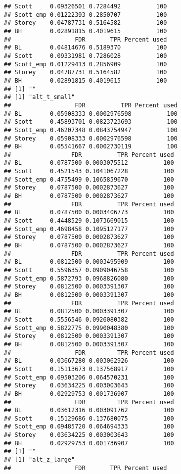 \documentclass{article}\usepackage[]{graphicx}\usepackage[]{color}
\makeatletter
\newenvironment{kframe}{%
 \def\at@end@of@kframe{}%
 \ifinner\ifhmode%
  \def\at@end@of@kframe{\end{minipage}}%
  \begin{minipage}{\columnwidth}%
 \fi\fi%
 \def\FrameCommand##1{\hskip\@totalleftmargin \hskip-\fboxsep
 \colorbox{shadecolor}{##1}\hskip-\fboxsep
     \hskip-\linewidth \hskip-\@totalleftmargin \hskip\columnwidth}%
 \MakeFramed {\advance\hsize-\width
   \@totalleftmargin\z@ \linewidth\hsize
   \@setminipage}}%
 {\par\unskip\endMakeFramed%
 \at@end@of@kframe}
\newenvironment{knitrout}{}{} %
\makeatother
\begin{document}
\begin{knitrout}
\begin{kframe}
\begin{verbatim}
## Scott     0.09326501 0.7284492          100
## Scott_emp 0.01222393 0.2850707          100
## Storey    0.04787731 0.5164582          100
## BH        0.02891815 0.4019615          100
##                  FDR       TPR Percent used
## BL        0.04814676 0.5189370          100
## Scott     0.09331981 0.7286028          100
## Scott_emp 0.01229413 0.2856909          100
## Storey    0.04787731 0.5164582          100
## BH        0.02891815 0.4019615          100
## [1] ""
## [1] "alt_t_small"
##                  FDR          TPR Percent used
## BL        0.05908333 0.0002976598          100
## Scott     0.45893701 0.0823723693          100
## Scott_emp 0.46207348 0.0843754947          100
## Storey    0.05908333 0.0002976598          100
## BH        0.05541667 0.0002730119          100
##                 FDR          TPR Percent used
## BL        0.0787500 0.0003075512          100
## Scott     0.4521543 0.1041067228          100
## Scott_emp 0.4755499 0.1065859670          100
## Storey    0.0787500 0.0002873627          100
## BH        0.0787500 0.0002873627          100
##                 FDR          TPR Percent used
## BL        0.0787500 0.0003406773          100
## Scott     0.4448529 0.1073669015          100
## Scott_emp 0.4698458 0.1095127177          100
## Storey    0.0787500 0.0002873627          100
## BH        0.0787500 0.0002873627          100
##                 FDR          TPR Percent used
## BL        0.0812500 0.0003495909          100
## Scott     0.5596357 0.0909046758          100
## Scott_emp 0.5872793 0.0968826080          100
## Storey    0.0812500 0.0003391307          100
## BH        0.0812500 0.0003391307          100
##                 FDR          TPR Percent used
## BL        0.0812500 0.0003391307          100
## Scott     0.5556546 0.0926080382          100
## Scott_emp 0.5822775 0.0990048380          100
## Storey    0.0812500 0.0003391307          100
## BH        0.0812500 0.0003391307          100
##                  FDR         TPR Percent used
## BL        0.03667280 0.003062926          100
## Scott     0.15113673 0.137568917          100
## Scott_emp 0.09503206 0.064570231          100
## Storey    0.03634225 0.003003643          100
## BH        0.02929753 0.001736907          100
##                  FDR         TPR Percent used
## BL        0.03612316 0.003091762          100
## Scott     0.15129686 0.137680075          100
## Scott_emp 0.09485720 0.064694333          100
## Storey    0.03634225 0.003003643          100
## BH        0.02929753 0.001736907          100
## [1] ""
## [1] "alt_z_large"
##                  FDR       TPR Percent used

\end{verbatim}
\end{kframe}
\end{knitrout}
\end{document}
